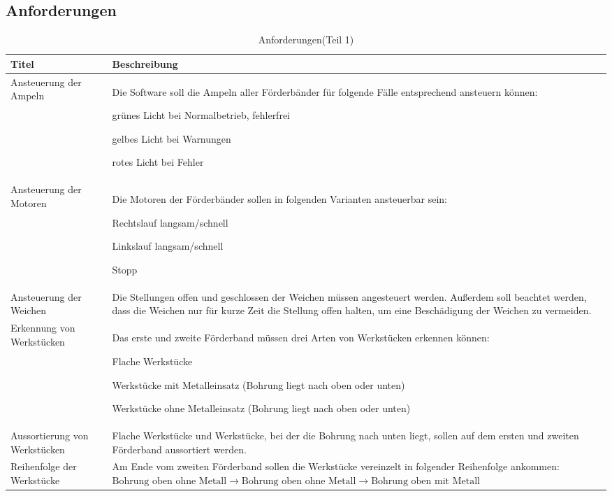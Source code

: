 \documentclass[a4paper, 11pt]{article}
\newcommand{\su}{\glqq} %
\newcommand{\so}{\grqq\xspace} %
\begin{document}
\newpage

\subsection{Anforderungen}
\begin{table}[h]
\center
\begin{tabularx}{\textwidth}{|X|X|}
\hline
\textbf{Titel}&\textbf{Beschreibung}\\
\hline
Ansteuerung der Ampeln&Die Software soll die Ampeln aller Förderbänder für folgende Fälle entsprechend ansteuern können:
\begin{compactenum}[-]
\item grünes Licht bei Normalbetrieb, fehlerfrei 
\item gelbes Licht bei Warnungen 
\item rotes Licht bei Fehler 
\end{compactenum}\\
\hline
Ansteuerung der Motoren&Die Motoren der Förderbänder sollen in folgenden Varianten ansteuerbar sein: 
\begin{compactenum}[-]
\item Rechtslauf langsam/schnell
\item Linkslauf langsam/schnell
\item Stopp
\end{compactenum}\\
\hline
Ansteuerung der Weichen&Die Stellungen \su offen\so und \su geschlossen\so der Weichen müssen angesteuert werden. Außerdem soll beachtet werden, dass die Weichen nur für kurze Zeit die Stellung \su offen\so halten, um eine Beschädigung der Weichen zu vermeiden.\\
\hline
Erkennung von Werkstücken&Das erste und zweite Förderband müssen drei Arten von Werkstücken erkennen können: 
\begin{compactenum}[-]
\item Flache Werkstücke 
\item Werkstücke mit Metalleinsatz (Bohrung liegt nach oben oder unten) 
\item Werkstücke ohne Metalleinsatz (Bohrung liegt nach oben oder unten)
\end{compactenum}\\
\hline
Aussortierung von Werkstücken&Flache Werkstücke und Werkstücke, bei der die Bohrung nach unten liegt, sollen auf dem ersten und zweiten Förderband aussortiert werden. \\
\hline
Reihenfolge der Werkstücke&Am Ende vom zweiten Förderband sollen die Werkstücke vereinzelt in folgender Reihenfolge ankommen:\hspace{2cm}
$\text{Bohrung oben ohne Metall}\rightarrow \text{Bohrung oben ohne Metall}\rightarrow \text{Bohrung oben mit Metall}$ \\
\hline
\end{tabularx}
\caption{Anforderungen(Teil 1)}
\label{anf1}
\end{table}
\end{document}
